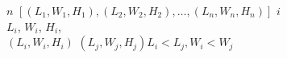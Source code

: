 \documentclass[preview]{standalone}
\begin{document}
\centering {} $n$   $[ (L_1, W_1, H_1), (L_2, W_2, H_2), \ldots , (L_n, W_n, H_n) ]$  $i$ \\  $L_i$, $W_i$, $H_i$, \\  $(L_i, W_i, H_i)$ $(L_j, W_j, H_j)$$L_i < L_j, W_i < W_j$
\end{document}
